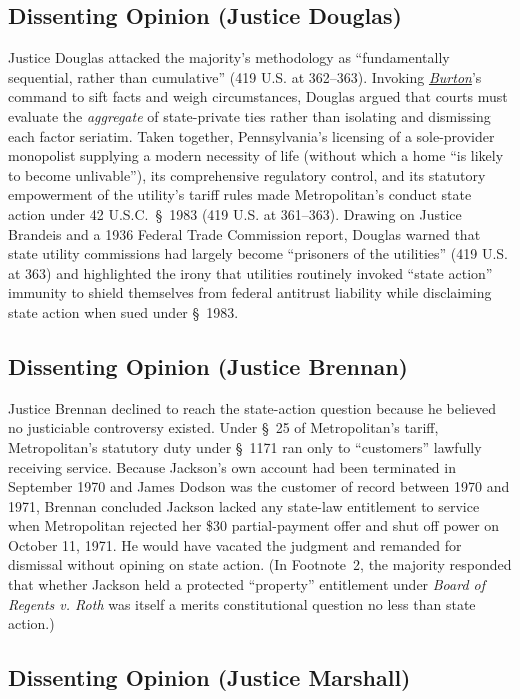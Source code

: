 \documentclass[12pt]{article}
\begin{document}
\subsection{Dissenting Opinion (Justice Douglas)}

Justice Douglas attacked the majority's methodology as ``fundamentally sequential, rather than cumulative'' (419 U.S. at 362--363). Invoking \href{https://supreme.justia.com/cases/federal/us/365/715/}{\emph{Burton}}'s command to sift facts and weigh circumstances, Douglas argued that courts must evaluate the \emph{aggregate} of state-private ties rather than isolating and dismissing each factor seriatim. Taken together, Pennsylvania's licensing of a sole-provider monopolist supplying a modern necessity of life (without which a home ``is likely to become unlivable''), its comprehensive regulatory control, and its statutory empowerment of the utility's tariff rules made Metropolitan's conduct state action under 42 U.S.C.\ \S~1983 (419 U.S. at 361--363). Drawing on Justice Brandeis and a 1936 Federal Trade Commission report, Douglas warned that state utility commissions had largely become ``prisoners of the utilities'' (419 U.S. at 363) and highlighted the irony that utilities routinely invoked ``state action'' immunity to shield themselves from federal antitrust liability while disclaiming state action when sued under \S~1983.

\subsection{Dissenting Opinion (Justice Brennan)}

Justice Brennan declined to reach the state-action question because he believed no justiciable controversy existed. Under \S~25 of Metropolitan's tariff, Metropolitan's statutory duty under \S~1171 ran only to ``customers'' lawfully receiving service. Because Jackson's own account had been terminated in September 1970 and James Dodson was the customer of record between 1970 and 1971, Brennan concluded Jackson lacked any state-law entitlement to service when Metropolitan rejected her \$30 partial-payment offer and shut off power on October 11, 1971. He would have vacated the judgment and remanded for dismissal without opining on state action. (In Footnote~2, the majority responded that whether Jackson held a protected ``property'' entitlement under \emph{Board of Regents v. Roth} was itself a merits constitutional question no less than state action.)

\subsection{Dissenting Opinion (Justice Marshall)}
\end{document}
